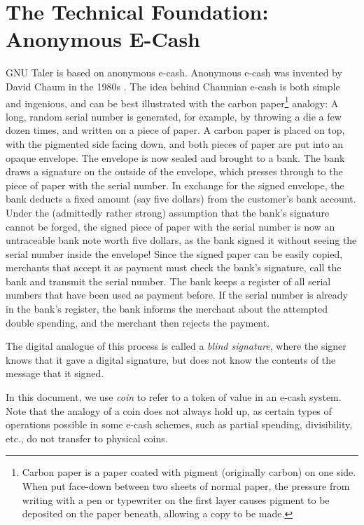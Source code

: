\section{The Technical Foundation: Anonymous E-Cash} \label{sec:intro:ecash}
GNU Taler is based on anonymous e-cash.  Anonymous e-cash was invented by David
Chaum in the 1980s \cite{chaum1983blind}.  The idea behind Chaumian e-cash is
both simple and ingenious, and can be best illustrated
with the carbon paper\footnote{%
  Carbon paper is a paper coated with pigment (originally carbon) on one side.
  When put face-down between two sheets of normal paper, the pressure from
  writing with a pen or typewriter on the first layer causes pigment to be
  deposited on the paper beneath, allowing a copy to be made.
} analogy:  A long, random serial number is generated, for example, by throwing
a die a few dozen times, and written on a piece of paper.  A carbon paper is
placed on top, with the pigmented side facing down, and both pieces of paper
are put into an opaque envelope.  The envelope is now sealed and brought to a
bank.  The bank draws a signature on the outside of the envelope, which presses
through to the piece of paper with the serial number.  In exchange for the
signed envelope, the bank deducts a fixed amount (say five dollars) from the
customer's bank account.  Under the (admittedly rather strong) assumption that
the bank's signature cannot be forged, the signed piece of paper with the serial
number is now an untraceable bank note worth five dollars, as the bank signed
it without seeing the serial number inside the envelope!  Since the signed
paper can be easily copied, merchants that accept it as payment must check the
bank's signature, call the bank and transmit the serial number.  The bank keeps
a register of all serial numbers that have been used as payment before.  If the
serial number is already in the bank's register, the bank informs the merchant
about the attempted double spending, and the merchant then rejects the payment.

The digital analogue of this process is called a \emph{blind signature}, where
the signer knows that it gave a digital signature, but does not know the
contents of the message that it signed.

In this document, we use \emph{coin} to refer to a token of value in an e-cash
system.  Note that the analogy of a coin does not always hold up, as certain
types of operations possible in some e-cash schemes, such as partial spending,
divisibility, etc., do not transfer to physical coins.


